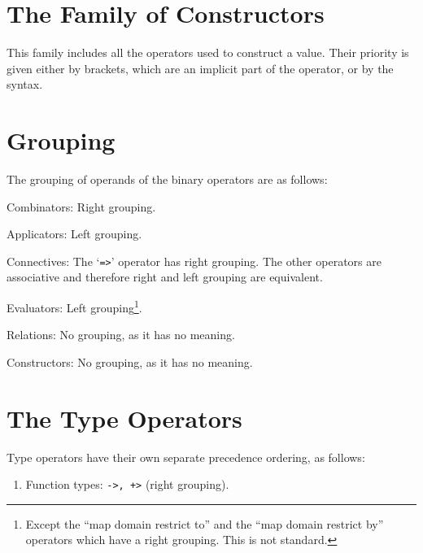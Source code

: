 \documentclass{overturerepchap}
\begin{document}
{\section{The Family of Constructors}

This family includes all the operators used to construct a value.  Their
priority is given either by brackets, which are an implicit part of the
operator, or by the syntax.

\section{Grouping}\label{grouping}

The grouping of operands of the binary operators are as follows:

\begin{list}{\bf no label!}{%
    \def\mylabel#1{\hspace\labelsep #1\hfill}
    \let\makelabel\mylabel
    \settowidth{\labelwidth}{Constructors: }
    \setlength{\leftmargin}{\labelwidth}
    \addtolength{\leftmargin}{2\labelsep}
    }
\item[Combinators:] Right grouping.

\item[Applicators:] Left grouping.

\item[Connectives:] The `{\tt =>}' operator has right grouping.  The other
  operators are associative and therefore right and left grouping are
  equivalent.

\item[Evaluators:] Left grouping\footnote{Except the ``map domain restrict
    to'' and the ``map domain restrict by'' operators which have a right
    grouping. This is not standard.}.

\item[Relations:] No grouping, as it has no meaning.

\item[Constructors:] No grouping, as it has no meaning.
\end{list}

\section{The Type Operators}\label{preceedence}

Type operators have their own separate precedence ordering, as follows:
\begin{enumerate}
\item Function types: {\tt ->, +>} (right grouping).


\end{enumerate}}
\end{document}
